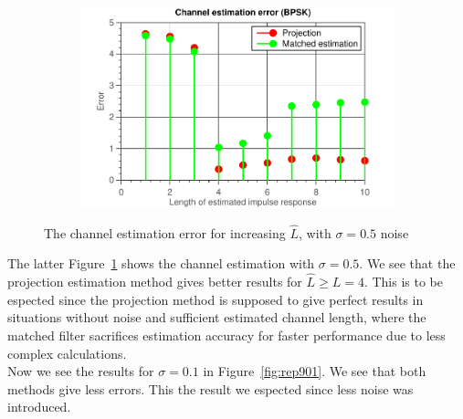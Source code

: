\documentclass[11pt,titlepage]{report}
\begin{document}
\begin{figure}[H]
\begin{subfigure}{0.49\textwidth}
	\end{subfigure}
	\begin{subfigure}{0.49\textwidth}
		\includegraphics[width=\textwidth]{../../deliverable-7-resources/figures/ass-1/report-8-9-10/report-9-noise-0.5/ass-1-report-9-BPSK.pdf}
	\end{subfigure}
	\caption{The channel estimation error for increasing $\hat{L}$,  with $\sigma = 0.5$ noise}
	\label{fig:rep905}
\end{figure}

The latter Figure~\ref{fig:rep905} shows the channel estimation with $\sigma = 0.5$. We see that the projection estimation method gives better results for $\hat{L} \ge L = 4$. This is to be espected since the projection method is supposed to give perfect results in situations without noise and sufficient estimated channel length, where the matched filter sacrifices estimation accuracy for faster performance due to less complex calculations. \\
Now we see the results for $\sigma = 0.1$ in  Figure~\ref{fig:rep901}. We see that both methods give less errors. This the result we espected since less noise was introduced.
\end{document}
